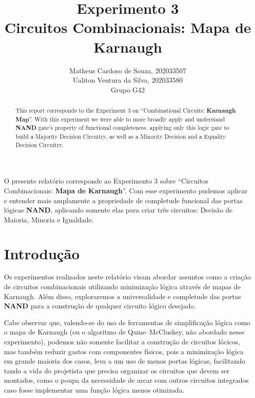 \documentclass[12pt]{article}
\title{Experimento 3\\
Circuitos Combinacionais: Mapa de Karnaugh}
\author{Matheus Cardoso de Souza, 202033507\\
        Ualiton Ventura da Silva, 202033580\\
        Grupo G42
}
\begin{document}
\maketitle

 \begin{abstract}
   This report corresponds to the Experiment 3 on ``Combinational Circuits:
   \textbf{Karnaugh Map}''. With this experiment we were able to more broadly
   apply and understand \textbf{NAND} gate's property of functional
   completeness, applying only this logic gate to build a Majority Decision
   Circuitry, as well as a Minority Decision and a Equality Decision Circuitry.
 \end{abstract}

 \begin{resumo}
   O presente relatório corresponde ao Experimento 3 sobre ``Circuitos
   Combinacionais: \textbf{Mapa de Karnaugh}''. Com esse experimento pudemos
   aplicar e entender mais amplamente a propriedade de completude funcional das
   portas lógicas \textbf{NAND}, aplicando somente elas para criar três
   circuitos: Decisão de Maioria, Minoria e Igualdade.
 \end{resumo}


\section{Introdução}
\label{sec:Introducao}


Os experimentos realizados neste relatório visam abordar assuntos como a
criação de circuitos combinacionais utilizando minimização lógica através de
mapas de Karnaugh. Além disso, exploraremos a universalidade e completude das
portas \textbf{NAND} para a construção de qualquer circuito lógico desejado.

Cabe observar que, valendo-se do uso de ferramentas de simplificação lógica como
o mapa de Karnaugh (ou o algoritmo de Quine–McCluskey, não abordado nesse
experimento), podemos não somente facilitar a construção de circuitos lócicos,
mas também reduzir gastos com componentes físicos, pois a minimização lógica em
grande maioria dos casos, leva a um uso de menos portas lógicas, facilitando
tando a vida do projetista que precisa organizar os circuitos que devem ser
montados, como o poupa da necessidade de arcar com outros circuitos integrados
caso fosse implementar uma função lógica menos otimizada.
\end{document}
